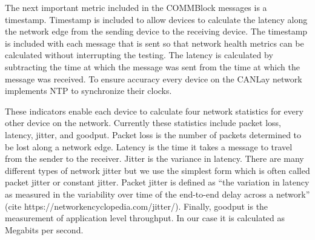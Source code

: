 \documentclass[letterpaper,twocolumn,12pt]{article}
\begin{document}

The next important metric included in the COMMBlock messages is a timestamp. Timestamp is included to allow devices to calculate the latency along the network edge from the sending device to the receiving device.
The timestamp is included with each message that is sent so that network health metrics can be calculated without interrupting the testing. The latency is calculated by subtracting the time at which the message was sent from the time at which the message was received. To ensure accuracy every device on the CANLay network implements NTP to synchronize their clocks.

These indicators enable each device to calculate four network statistics for every other device on the network. Currently these statistics include packet loss, latency, jitter, and goodput. Packet loss is the number of packets determined to be lost along a network edge. Latency is the time it takes a message to travel from the sender to the receiver. Jitter is the variance in latency. There are many different types of network jitter but we use the simplest form which is often called packet jitter or constant jitter. Packet jitter is defined as “the variation in latency as measured in the variability over time of the end-to-end delay across a network”
(cite https://networkencyclopedia.com/jitter/). Finally, goodput is the measurement of application level throughput. In our case it is calculated as Megabits per second.
\end{document}
